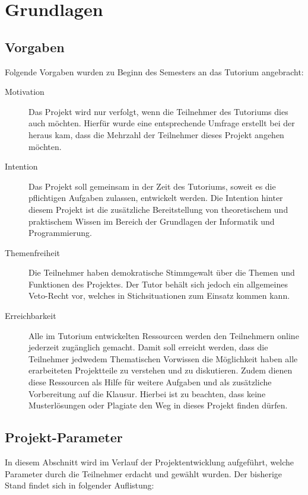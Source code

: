 
\section{Grundlagen}
\label{ch:basics}

\subsection{Vorgaben}
\label{ch:presets}
Folgende Vorgaben wurden zu Beginn des Semesters an das Tutorium angebracht:
\begin{description}
	\item[Motivation] Das Projekt wird nur verfolgt, wenn die Teilnehmer des Tutoriums dies auch möchten. Hierfür wurde eine entsprechende Umfrage erstellt bei der heraus kam, dass die Mehrzahl der Teilnehmer dieses Projekt angehen möchten.
	\item[Intention] Das Projekt soll gemeinsam in der Zeit des Tutoriums, soweit es die pflichtigen Aufgaben zulassen, entwickelt werden. Die Intention hinter diesem Projekt ist die zusätzliche Bereitstellung von theoretischem und praktischem Wissen im Bereich der Grundlagen der Informatik und Programmierung.
	\item[Themenfreiheit] Die Teilnehmer haben demokratische Stimmgewalt über die Themen und Funktionen des Projektes. Der Tutor behält sich jedoch ein allgemeines Veto-Recht vor, welches in Stichsituationen zum Einsatz kommen kann.
	\item[Erreichbarkeit] Alle im Tutorium entwickelten Ressourcen werden den Teilnehmern online jederzeit zugänglich gemacht. Damit soll erreicht werden, dass die Teilnehmer jedwedem Thematischen Vorwissen die Möglichkeit haben alle erarbeiteten Projektteile zu verstehen und zu diskutieren. Zudem dienen diese Ressourcen als Hilfe für weitere Aufgaben und als zusätzliche Vorbereitung auf die Klausur. Hierbei ist zu beachten, dass keine Musterlösungen oder Plagiate den Weg in dieses Projekt finden dürfen.
\end{description}

\pagebreak

\subsection{Projekt-Parameter}
\label{ch:params}
In diesem Abschnitt wird im Verlauf der Projektentwicklung aufgeführt, welche Parameter durch die Teilnehmer erdacht und gewählt wurden. Der bisherige Stand findet sich in folgender Auflistung:

